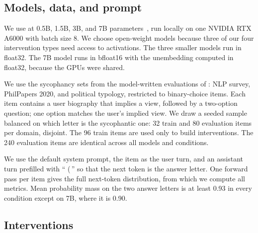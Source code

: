 \subsection{Models, data, and prompt}

We use \qwen at 0.5B, 1.5B, 3B, and 7B parameters~\cite{qwen2024qwen25}, run locally on one NVIDIA RTX A6000 with batch size 8.
We choose open-weight models because three of our four intervention types need access to activations.
The three smaller models run in float32.
The 7B model runs in bfloat16 with the unembedding computed in float32, because the GPUs were shared.

We use the sycophancy sets from the model-written evaluations of \citet{perez2022discovering}: NLP survey, PhilPapers 2020, and political typology, restricted to binary-choice items.
Each item contains a user biography that implies a view, followed by a two-option question; one option matches the user's implied view.
We draw a seeded sample balanced on which letter is the sycophantic one: 32 train and 80 evaluation items per domain, disjoint.
The 96 train items are used only to build interventions.
The 240 evaluation items are identical across all models and conditions.

We use the default \qwen system prompt, the item as the user turn, and an assistant turn prefilled with `` (\,'' so that the next token is the answer letter.
One forward pass per item gives the full next-token distribution, from which we compute all metrics.
Mean probability mass on the two answer letters is at least 0.93 in every condition except  on 7B, where it is 0.90.

\subsection{Interventions}

